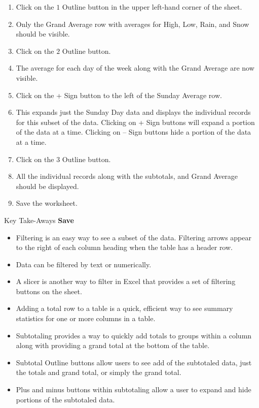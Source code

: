 \begin{enumerate}
	\item Click on the $ 1 $ Outline button in the upper left-hand corner of the sheet.
	\item Only the Grand Average row with averages for High, Low, Rain, and Snow should be visible.
	\item Click on the $ 2 $ Outline button.
	\item The average for each day of the week along with the Grand Average are now visible.
	\item Click on the + Sign button to the left of the Sunday Average row.
	\item This expands just the Sunday Day data and displays the individual records for this subset of the data. Clicking on + Sign buttons will expand a portion of the data at a time. Clicking on – Sign buttons hide a portion of the data at a time.
	\item Click on the $ 3 $ Outline button.
	\item All the individual records along with the subtotals, and Grand Average should be displayed. 
	\item Save the worksheet.
\end{enumerate}

\begin{center}
	\begin{tkwbox}{Key Take-Aways}
		\textbf{Save}
		\\
		\begin{itemize}
			\setlength{\itemsep}{0pt}
			\setlength{\parskip}{0pt}
			\setlength{\parsep}{0pt}

			\item Filtering is an easy way to see a subset of the data. Filtering arrows appear to the right of each column heading when the table has a header row.
			\item Data can be filtered by text or numerically.
			\item A slicer is another way to filter in Excel that provides a set of filtering buttons on the sheet.
			\item Adding a total row to a table is a quick, efficient way to see summary statistics for one or more columns in a table.
			\item Subtotaling provides a way to quickly add totals to groups within a column along with providing a grand total at the bottom of the table.
			\item Subtotal Outline buttons allow users to see add of the subtotaled data, just the totals and grand total, or simply the grand total.
			\item Plus and minus buttons within subtotaling allow a user to expand and hide portions of the subtotaled data.
			
		\end{itemize}
	\end{tkwbox}
\end{center}

